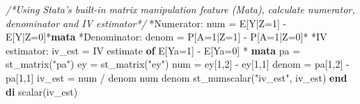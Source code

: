 \documentclass[
  10pt,
]{book}
\newenvironment{Shaded}{\begin{snugshade}}{\end{snugshade}}
\newcommand{\CommentTok}[1]{\textcolor[rgb]{0.56,0.35,0.01}{\textit{#1}}}
\newcommand{\FunctionTok}[1]{\textcolor[rgb]{0.00,0.00,0.00}{#1}}
\newcommand{\KeywordTok}[1]{\textcolor[rgb]{0.13,0.29,0.53}{\textbf{#1}}}
\newcommand{\NormalTok}[1]{#1}
\newcommand{\StringTok}[1]{\textcolor[rgb]{0.31,0.60,0.02}{#1}}
\begin{document}
\begin{Shaded}
\begin{Highlighting}[]
\CommentTok{/*Using Stata's built-in matrix manipulation feature (Mata), }
\CommentTok{calculate numerator, denominator and IV estimator*/}
\NormalTok{*Numerator: num = E[Y|Z=1] - E[Y|Z=0]*}\KeywordTok{mata}
\NormalTok{*Denominator: denom = P[A=1|Z=1] - P[A=1|Z=0]*}
\NormalTok{*IV estimator: iv_est = IV estimate }\KeywordTok{of}\NormalTok{ E[Ya=1] - E[Ya=0] *}
\KeywordTok{mata} 
\NormalTok{pa = st_matrix(}\StringTok{"pa"}\NormalTok{)}
\NormalTok{ey = st_matrix(}\StringTok{"ey"}\NormalTok{)}
\NormalTok{num = ey[1,2] - ey[1,1] }
\NormalTok{denom = pa[1,2] - pa[1,1]}
\NormalTok{iv_est = num / denom }
\NormalTok{num}
\NormalTok{denom}
\NormalTok{st_numscalar(}\StringTok{"iv_est"}\NormalTok{, iv_est)}
\KeywordTok{end}
\KeywordTok{di} \FunctionTok{scalar}\NormalTok{(iv_est)}
\end{Highlighting}
\end{Shaded}
\end{document}
